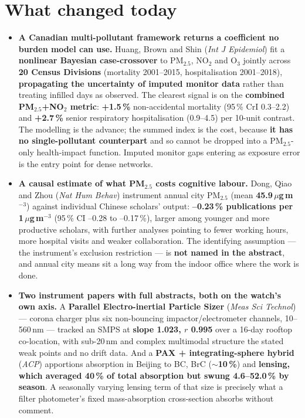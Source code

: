 \documentclass[10pt]{article}
\begin{document}
\vspace{3mm}

\section*{\sffamily\bfseries\color{Deep}What changed today}
\vspace{-1.5mm}{\color{Amber}\rule{\linewidth}{1.1pt}}\vspace{2.5mm}

\footnotesize
\begin{itemize}

\item \textbf{A Canadian multi-pollutant framework returns a coefficient no burden model
can use.} Huang, Brown and Shin (\textit{Int J Epidemiol}) fit a \textbf{nonlinear Bayesian
case-crossover} to PM$_{2.5}$, NO$_2$ and O$_3$ jointly across \textbf{20 Census Divisions}
(mortality 2001--2015, hospitalisation 2001--2018), \textbf{propagating the uncertainty of
imputed monitor data} rather than treating infilled days as observed. The clearest signal
is on the \textbf{combined PM$_{2.5}$+NO$_2$ metric}: \textbf{+1.5\,\%} non-accidental
mortality (95\,\% CrI 0.3--2.2) and \textbf{+2.7\,\%} senior respiratory hospitalisation
(0.9--4.5) per 10-unit contrast. The modelling is the advance; the summed index is the
cost, because \textbf{it has no single-pollutant counterpart} and so cannot be dropped into
a PM$_{2.5}$-only health-impact function. Imputed monitor gaps entering as exposure error is
the entry point for dense networks.

\item \textbf{A causal estimate of what PM$_{2.5}$ costs cognitive labour.} Dong, Qiao
and Zhou (\textit{Nat Hum Behav}) instrument annual city PM$_{2.5}$ (mean
\textbf{45.9\,$\mu$g\,m$^{-3}$}) against individual Chinese scholars' output:
\textbf{--0.23\,\% publications per 1\,$\mu$g\,m$^{-3}$} (95\,\% CI --0.28 to --0.17\,\%),
larger among younger and more productive scholars, with further analyses pointing to fewer
working hours, more hospital visits and weaker collaboration. The identifying assumption --- the
instrument's exclusion restriction --- is \textbf{not named in the abstract}, and annual
city means sit a long way from the indoor office where the work is done.

\item \textbf{Two instrument papers with full abstracts, both on the watch's own axis.}
A \textbf{Parallel Electro-inertial Particle Sizer} (\textit{Meas Sci Technol}) --- corona
charger plus six non-bouncing impactor/electrometer channels, 10--560\,nm --- tracked an
SMPS at \textbf{slope 1.023, $r$ 0.995} over a 16-day rooftop co-location, with sub-20\,nm
and complex multimodal structure the stated weak points and no drift data. And a
\textbf{PAX + integrating-sphere hybrid} (\textit{ACP}) apportions absorption in Beijing to
BC, BrC (\textbf{$\sim$10\,\%}) and \textbf{lensing, which averaged 40\,\% of total
absorption but swung 4.6--52.0\,\% by season}. A seasonally varying lensing term of that
size is precisely what a filter photometer's fixed mass-absorption cross-section absorbs
without comment.


\end{itemize}
\end{document}
